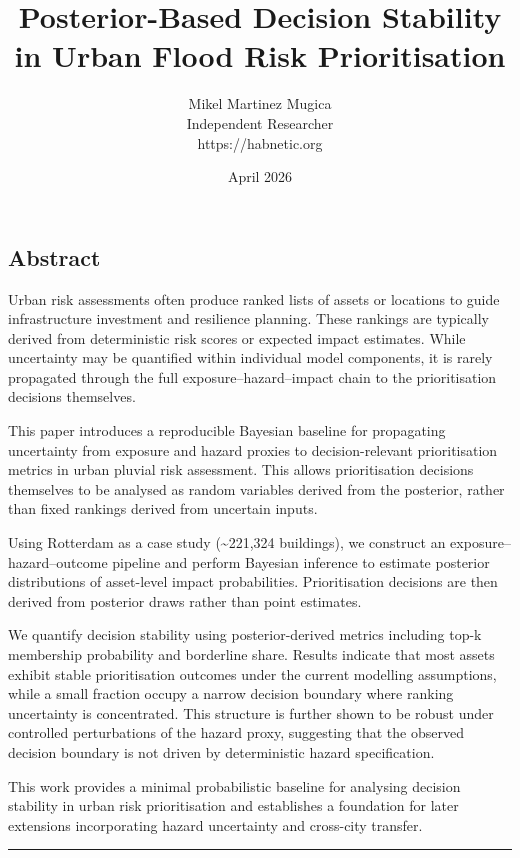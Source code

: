 \documentclass[
]{article}
\title{Posterior-Based Decision Stability in Urban Flood Risk
Prioritisation}
\author{Mikel Martinez Mugica\\
Independent Researcher\\
https://habnetic.org}
\date{April 2026}
\begin{document}
\maketitle

\subsection{Abstract}\label{abstract}

Urban risk assessments often produce ranked lists of assets or locations
to guide infrastructure investment and resilience planning. These
rankings are typically derived from deterministic risk scores or
expected impact estimates. While uncertainty may be quantified within
individual model components, it is rarely propagated through the full
exposure--hazard--impact chain to the prioritisation decisions
themselves.

This paper introduces a reproducible Bayesian baseline for propagating
uncertainty from exposure and hazard proxies to decision-relevant
prioritisation metrics in urban pluvial risk assessment. This allows
prioritisation decisions themselves to be analysed as random variables
derived from the posterior, rather than fixed rankings derived from
uncertain inputs.

Using Rotterdam as a case study (\textasciitilde221,324 buildings), we
construct an exposure--hazard--outcome pipeline and perform Bayesian
inference to estimate posterior distributions of asset-level impact
probabilities. Prioritisation decisions are then derived from posterior
draws rather than point estimates.

We quantify decision stability using posterior-derived metrics including
top-k membership probability and borderline share. Results indicate that
most assets exhibit stable prioritisation outcomes under the current
modelling assumptions, while a small fraction occupy a narrow decision
boundary where ranking uncertainty is concentrated. This structure is
further shown to be robust under controlled perturbations of the hazard
proxy, suggesting that the observed decision boundary is not driven by
deterministic hazard specification.

This work provides a minimal probabilistic baseline for analysing
decision stability in urban risk prioritisation and establishes a
foundation for later extensions incorporating hazard uncertainty and
cross-city transfer.

\begin{center}\rule{0.5\linewidth}{0.5pt}\end{center}
\end{document}
